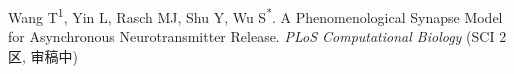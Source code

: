 \begin{resume}
  \begin{enumerate}[{[}1{]}]
  \item Wang T\textsuperscript{1}, Yin L, Rasch MJ, Shu Y, Wu S\textsuperscript{*}. A Phenomenological Synapse Model for Asynchronous Neurotransmitter Release. {\it PLoS Computational Biology} (SCI 2区, 审稿中)
  \end{enumerate}

\end{resume}
